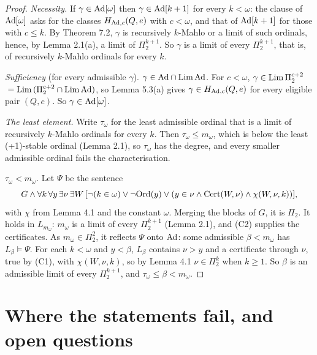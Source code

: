 \documentclass[11pt]{article}
\begin{document}
\begin{proof}
\emph{Necessity.} If $\gamma \in \mathrm{Ad}[\omega]$ then $\gamma \in \mathrm{Ad}[k+1]$ for every $k < \omega$: the clause of
$\mathrm{Ad}[\omega]$ asks for the classes $H_{\mathrm{Ad},c}(Q,e)$ with $c < \omega$, and that of $\mathrm{Ad}[k+1]$ for those with $c \le k$.
By Theorem 7.2, $\gamma$ is recursively $k$-Mahlo or a limit of such ordinals, hence, by Lemma 2.1(a), a limit of
$\Pi_2^{k+1}$. So $\gamma$ is a limit of every $\Pi_2^{k+1}$, that is, of recursively $k$-Mahlo ordinals for every
$k$.

\emph{Sufficiency} (for every admissible $\gamma$). $\gamma \in \mathrm{Ad} \cap \mathrm{Lim}\, \mathrm{Ad}$. For $c < \omega$, $\gamma \in \mathrm{Lim}\,
\Pi_2^{c+2}$ ${}= \mathrm{Lim}\,(\Pi_2^{c+2} \cap \mathrm{Lim}\, \mathrm{Ad})$, so Lemma 5.3(a) gives $\gamma \in H_{\mathrm{Ad},c}(Q,e)$ for every eligible pair
$(Q,e)$. So $\gamma \in \mathrm{Ad}[\omega]$.

\emph{The least element.} Write $\tau_\omega$ for the least admissible ordinal that is a limit of recursively
$k$-Mahlo ordinals for every $k$. Then $\tau_\omega \le m_\omega$, which is below the least (+1)-stable ordinal (Lemma 2.1), so $\tau_\omega$ has the degree, and every
smaller admissible ordinal fails the characterisation.

\emph{$\tau_\omega < m_\omega$.} Let $\Psi$ be the sentence
\[ G \wedge \forall k\, \forall y\, \exists \nu\, \exists W\, [\neg(k \in \omega) \vee \neg\mathrm{Ord}(y) \vee (y \in
   \nu \wedge \mathrm{Cert}(W, \nu) \wedge \chi(W, \nu, k))], \]
with $\chi$ from Lemma 4.1 and the constant $\omega$. Merging the blocks of $G$, it is $\Pi_2$. It holds in
$L_{m_\omega}$: $m_\omega$ is a limit of every $\Pi_2^{k+1}$ (Lemma 2.1), and (C2) supplies the certificates. As $m_\omega \in
\Pi_2^2$, it reflects $\Psi$ onto $\mathrm{Ad}$: some admissible $\beta < m_\omega$ has $L_\beta \models \Psi$. For each $k <
\omega$ and $y < \beta$, $L_\beta$ contains $\nu > y$ and a certificate through $\nu$, true by (C1), with $\chi(W, \nu,
k)$, so by Lemma 4.1 $\nu \in \Pi_2^{k}$ when $k \ge 1$. So $\beta$ is an admissible limit of every
$\Pi_2^{k+1}$, and $\tau_\omega \le \beta <
m_\omega$.
\end{proof}

\section{Where the statements fail, and open questions}
\end{document}
